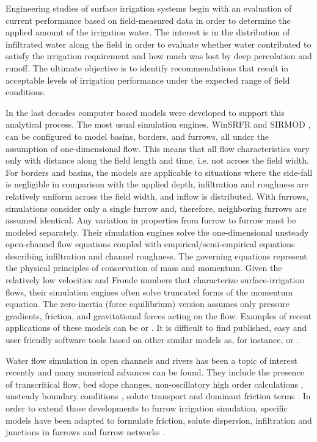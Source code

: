 \documentclass[review,authoryear]{elsarticle}
\begin{document}
Engineering studies of surface irrigation systems begin with an evaluation of
current performance based on field-measured data in order to determine the
applied amount of the irrigation water. The interest is in the distribution of
infiltrated water along the field in order to evaluate whether water contributed
to satisfy the irrigation requirement and how much was lost by deep percolation
and runoff. The ultimate objective is to identify recommendations that result in
acceptable levels of irrigation performance under the expected range of field
conditions.

In the last decades computer based models were developed to support this
analytical process. The most usual simulation engines, WinSRFR
\citep{Clemmens99} and SIRMOD \citep{Walker03}, can be configured to model
basins, borders, and furrows, all under the assumption of one-dimensional flow.
This means that all flow characteristics vary only with distance along the field
length and time, i.e. not across the field width. For borders and basins, the
models are applicable to situations where the side-fall is negligible in
comparison with the applied depth, infiltration and roughness are relatively
uniform across the field width, and inflow is distributed. With furrows,
simulations consider only a single furrow and, therefore, neighboring furrows
are assumed identical. Any variation in properties from furrow to furrow must be
modeled separately. Their simulation engines solve the one-dimensional unsteady
open-channel flow equations coupled with empirical/semi-empirical equations
describing infiltration and channel roughness. The governing equations represent
the physical principles of conservation of mass and momentum. Given the
relatively low velocities and Froude numbers that characterize
surface-irrigation flows, their simulation engines often solve truncated forms
of the momentum equation. The zero-inertia (force equilibrium) version assumes
only pressure gradients, friction, and gravitational forces acting on the flow. 
Examples of recent applications of these models can be
\cite{Bautista09a,Bautista09b} or \cite{EbrahimiamLiaghat11}. It is difficult
to find published, easy and user friendly software tools based on other similar
models as, for instance, \cite{Mailapalli09} or \cite{Soroush13}.

Water flow simulation in open channels and rivers has been a topic of interest
recently and many numerical advances can be found. They include the presence of
transcritical flow, bed slope changes, non-oscillatory high order calculations
\citep{JaviTVD}, unsteady boundary conditions \citep{JaviContorno}, solute
transport \citep{JaviTrans} and dominant friction terms
\citep{JaviFriccion,JaviFriccion2}. In order to extend those developments to
furrow irrigation simulation, specific models have been adapted to formulate
friction, solute dispersion, infiltration and junctions in furrows and furrow
networks \citep{JaviSurcos1,JaviSurcos2}.
\end{document}
